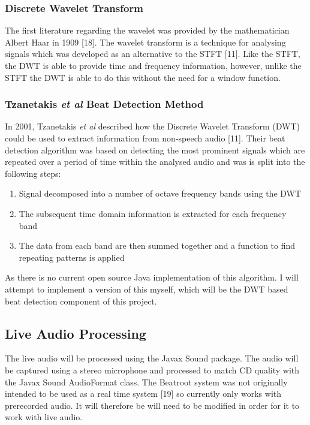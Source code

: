 \documentclass[a4paper, 11pt]{article}
\begin{document}
\subsubsection{Discrete Wavelet Transform}
The first literature regarding the wavelet was provided by the mathematician Albert Haar in 1909 [18]. The wavelet transform is a technique for analysing signals which was developed as an alternative to the STFT [11]. Like the STFT, the DWT is able to provide time and frequency information, however, unlike the STFT the DWT is able to do this without the need for a window function. 

\subsubsection{Tzanetakis \textit{et al} Beat Detection Method}
In 2001, Tzanetakis \textit{et al} described how the Discrete Wavelet Transform (DWT) could be used to extract information from non-speech audio [11]. Their beat detection algorithm was based on detecting the most prominent signals which are repeated over a period of time within the analysed audio and was is split into the following steps: 

\begin{enumerate}
\item Signal decomposed into a number of octave frequency bands using the DWT
\item The subsequent time domain information is extracted for each frequency band
\item The data from each band are then summed together and a function to find repeating patterns is applied
\end{enumerate}

As there is no current open source Java implementation of this algorithm. I will attempt to implement a version of this myself, which will be the DWT based beat detection component of this project.









\subsection{Live Audio Processing}
The live audio will be processed using the Javax Sound package. The audio will be captured using a stereo microphone and processed to match CD quality with the Javax Sound AudioFormat class. The Beatroot system was not originally intended to be used as a real time system [19] so currently only works with prerecorded audio. It will therefore be will need to be modified in order for it to work with live audio. 
\end{document}
